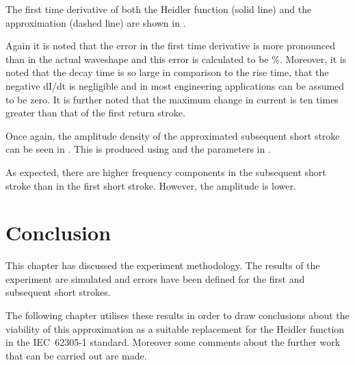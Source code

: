 The first time derivative of both the Heidler function (solid line) and the approximation (dashed line) are shown in .

Again it is noted that the error in the first time derivative is more pronounced than in the actual waveshape and this error is calculated to be \unskip \%. Moreover, it is noted that the decay time is so large in comparison to the rise time, that the negative dI/dt is negligible and in most engineering applications can be assumed to be zero. It is further noted that the maximum change in current is ten times greater than that of the first return stroke.

Once again, the amplitude density of the approximated subsequent short stroke can be seen in . This is produced using  and the parameters in .

As expected, there are higher frequency components in the subsequent short stroke than in the first short stroke. However, the amplitude is lower.


\section{Conclusion}
\label{sec:results_conclusion}
This chapter has discussed the experiment methodology. The results of the experiment are simulated and errors have been defined for the first and subsequent short strokes.

The following chapter utilises these results in order to draw conclusions about the viability of this approximation as a suitable replacement for the Heidler function in the IEC~62305-1 standard. Moreover some comments about the further work that can be carried out are made.
